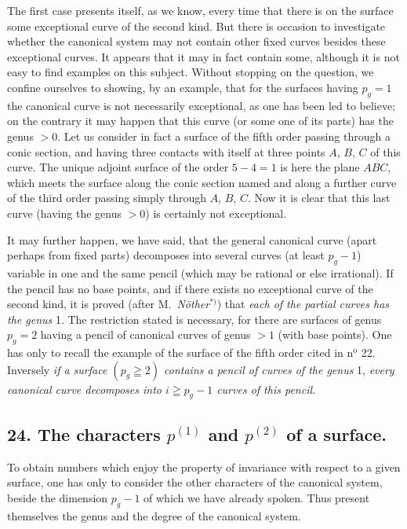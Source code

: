 \documentclass{article}
\begin{document}
The first case presents itself, as we know, every time that there is on the surface some exceptional curve of the second kind. But there is occasion to investigate whether the canonical system may not contain other fixed curves besides these exceptional curves. It appears that it may in fact contain some, although it is not easy to find examples on this subject. Without stopping on the question, we confine ourselves to showing, by an example, that for the surfaces having $p_{g} = 1$ the canonical curve is not necessarily exceptional, as one has been led to believe; on the contrary it may happen that this curve (or some one of its parts) has the genus $> 0$. Let us consider in fact a surface of the fifth order passing through a conic section, and having three contacts with itself at three points $A$, $B$, $C$ of this curve. The unique adjoint surface of the order $5-4=1$ is here the plane $ABC$, which meets the surface along the conic section named and along a further curve of the third order passing simply through $A$, $B$, $C$. Now it is clear that this last curve (having the genus $> 0$) is certainly not exceptional.

It may further happen, we have said, that the general canonical curve (apart perhaps from fixed parts) decomposes into several curves (at least $p_{g} - 1$) variable in one and the same pencil (which may be rational or else irrational). If the pencil has no base points, and if there exists no exceptional curve of the second kind, it is proved (after M.\ \emph{Nöther}${}^{*)}$) that \emph{each of the partial curves has the genus} 1. The restriction stated is necessary, for there are surfaces of genus $p_{g} = 2$ having a pencil of canonical curves of genus $> 1$ (with base points). One has only to recall the example of the surface of the fifth order cited in n${}^{\text{o}}$ 22. Inversely \emph{if a surface $(p_{g} \geqq 2)$ contains a pencil of curves of the genus} 1, \emph{every canonical curve decomposes into $i \geqq p_{g} - 1$ curves of this pencil.}

\subsection*{24. The characters $p^{(1)}$ and $p^{(2)}$ of a surface.}

To obtain numbers which enjoy the property of invariance with respect to a given surface, one has only to consider the other characters of the canonical system, beside the dimension $p_{g} - 1$ of which we have already spoken. Thus present themselves the genus and the degree of the canonical system.
\end{document}
